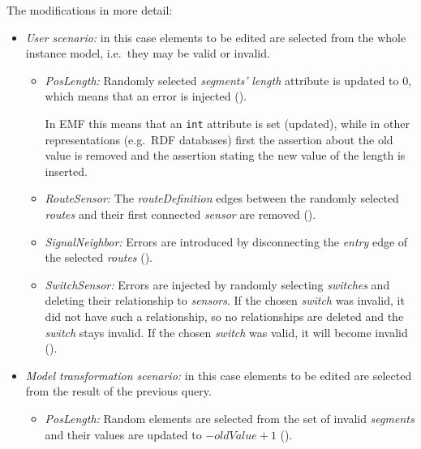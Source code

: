 The modifications in more detail:
\begin{itemize}
  \item \emph{User scenario:} in this case elements to be edited are selected from the whole instance model, i.e.\ they may be valid or invalid. 
  \begin{itemize}
    
    \item \emph{PosLength:} Randomly selected \emph{segments'} \emph{length} attribute is updated to 0, which means that an error is injected ().
    
    In EMF this means that an \texttt{int} attribute is set (updated), while in other representations (e.g.\ RDF databases) first the assertion about the old value is removed and the assertion stating the new value of the length is inserted.
    
    \item \emph{RouteSensor:} The \emph{routeDefinition} edges between the randomly selected \emph{routes} and their first connected \emph{sensor} are removed ().
    
    \item \emph{SignalNeighbor:} Errors are introduced by disconnecting the \emph{entry} edge of the selected \emph{routes} ().

    \item \emph{SwitchSensor:} Errors are injected by randomly selecting \emph{switches} and deleting their relationship to \emph{sensors}. If the chosen \emph{switch} was invalid, it did not have such a relationship, so no relationships are deleted and the \emph{switch} stays invalid. If the chosen \emph{switch} was valid, it will become invalid ().
        
  \end{itemize}
  \item \emph{Model transformation scenario:} in this case elements to be edited are selected from the result of the previous query.
  \begin{itemize}
    
    \item \emph{PosLength:} Random elements are selected from the set of invalid \emph{segments} and their values are updated to $- \mathit{oldValue} + 1$ ().
    

\end{itemize}
\end{itemize}
